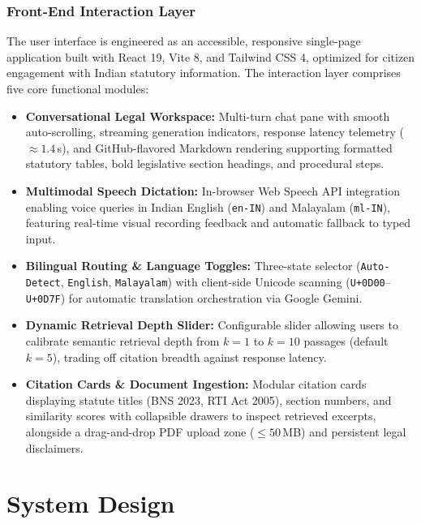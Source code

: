 \documentclass[12pt,a4paper]{report}
\begin{document}
\subsection{Front-End Interaction Layer}
The user interface is engineered as an accessible, responsive single-page application built with React 19, Vite 8, and Tailwind CSS 4, optimized for citizen engagement with Indian statutory information. The interaction layer comprises five core functional modules:

\begin{itemize}
    \item \textbf{Conversational Legal Workspace:} Multi-turn chat pane with smooth auto-scrolling, streaming generation indicators, response latency telemetry ($\approx 1.4$\,s), and GitHub-flavored Markdown rendering supporting formatted statutory tables, bold legislative section headings, and procedural steps.
    \item \textbf{Multimodal Speech Dictation:} In-browser Web Speech API integration enabling voice queries in Indian English (\texttt{en-IN}) and Malayalam (\texttt{ml-IN}), featuring real-time visual recording feedback and automatic fallback to typed input.
    \item \textbf{Bilingual Routing \& Language Toggles:} Three-state selector (\texttt{Auto-Detect}, \texttt{English}, \texttt{Malayalam}) with client-side Unicode scanning (\texttt{U+0D00}--\texttt{U+0D7F}) for automatic translation orchestration via Google Gemini.
    \item \textbf{Dynamic Retrieval Depth Slider:} Configurable slider allowing users to calibrate semantic retrieval depth from $k = 1$ to $k = 10$ passages (default $k = 5$), trading off citation breadth against response latency.
    \item \textbf{Citation Cards \& Document Ingestion:} Modular citation cards displaying statute titles (BNS 2023, RTI Act 2005), section numbers, and similarity scores with collapsible drawers to inspect retrieved excerpts, alongside a drag-and-drop PDF upload zone ($\le 50$\,MB) and persistent legal disclaimers.
\end{itemize}


\chapter{System Design}
\end{document}
